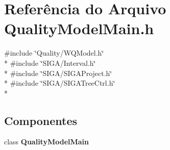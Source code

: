 \section{Referência do Arquivo Quality\+Model\+Main.\+h}
\label{_quality_model_main_8h}
{\ttfamily \#include \char`\"{}Quality/\+W\+Q\+Model.\+h\char`\"{}}\\*
{\ttfamily \#include \char`\"{}S\+I\+G\+A/\+Interval.\+h\char`\"{}}\\*
{\ttfamily \#include \char`\"{}S\+I\+G\+A/\+S\+I\+G\+A\+Project.\+h\char`\"{}}\\*
{\ttfamily \#include \char`\"{}S\+I\+G\+A/\+S\+I\+G\+A\+Tree\+Ctrl.\+h\char`\"{}}\\*
\subsection*{Componentes}
\begin{DoxyCompactItemize}
\item 
class {\bf Quality\+Model\+Main}
\end{DoxyCompactItemize}
